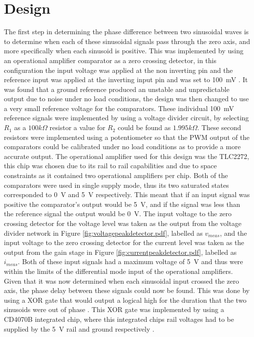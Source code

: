 \section{Design} \label{sec:design_phasetransducer}
The first step in determining the phase difference between two sinusoidal waves is to determine when each of these sinusoidal signals pass through the zero axis, and more specifically when each sinusoid is positive. This was implemented by using an operational amplifier comparator as a zero crossing detector, in this configuration the input voltage was applied at the non inverting pin and the reference input was applied at the inverting input pin and was set to \SI{100}{\milli \volt} \cite{ZeroCrossingDetector}. It was found that a ground reference produced an unstable and unpredictable output due to noise under no load conditions, the design was then changed to use a very small reference voltage for the comparators. These individual \SI{100}{\milli \volt} reference signals were implemented by using a voltage divider circuit, by selecting $R_1$ as a $100k\Omega$ resistor a value for $R_2$ could be found as $1.995k\Omega$. These second resistors were implemented using a potentiometer so that the PWM output of the comparators could be calibrated under no load conditions as to provide a more accurate output. The operational amplifier used for this design was the TLC2272, this chip was chosen due to its rail to rail capabilities and due to space constraints as it contained two operational amplifiers per chip. Both of the comparators were used in single supply mode, thus its two saturated states corresponded to \SI{0}{\volt} and \SI{5}{\volt} respectively. This meant that if an input signal was positive the comparator's output would be \SI{5}{\volt}, and if the signal was less than the reference signal the output would be \SI{0}{\volt}. \vspace{4mm} \newline
The input voltage to the zero crossing detector for the voltage level was taken as the output from the voltage divider network in Figure \ref{fig:voltagepeakdetector.pdf}, labelled as $v_{meas}$, and the input voltage to the zero crossing detector for the current level was taken as the output from the gain stage in Figure \ref{fig:currentpeakdetector.pdf}, labelled as $i_{meas}$. Both of these input signals had a maximum voltage of \SI{5}{\volt} and thus were within the limits of the differential mode input of the operational amplifiers. Given that it was now determined when each sinusoidal input crossed the zero axis, the phase delay between these signals could now be found. This was done by using a XOR gate that would output a logical high for the duration that the two sinusoids were out of phase \cite{PWMref}. This XOR gate was implemented by using a CD4070B integrated chip, where this integrated chips rail voltages had to be supplied by the \SI{5}{\volt} rail and ground respectively \cite{CD4070B:2003}. \vspace{4mm} \newline
